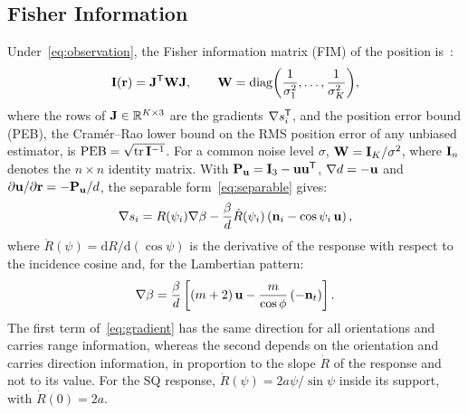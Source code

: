 \subsection{Fisher Information}
\label{subsec:fim}
Under~\eqref{eq:observation}, the Fisher information matrix (FIM) of the position is~\cite{Kay1993}:
\begin{equation}
 \mathbf{I}(\mathbf{r})=\mathbf{J}^{\mathsf T}\mathbf{W}\mathbf{J},\qquad
 {\mathbf{W}=\operatorname{diag}\!\left(\frac{1}{\sigma_1^2},\ldots,\frac{1}{\sigma_K^2}\right)},
 \label{eq:fim}
\end{equation}
where the rows of $\mathbf{J}\in\mathbb R^{K\times3}$ are the gradients $\nabla s_i^{\mathsf T}$, and the position error bound (PEB), the Cram\'er--Rao lower bound on the RMS position error of any unbiased estimator, is $\mathrm{PEB}=\sqrt{\operatorname{tr}\mathbf{I}^{-1}}$. For a common noise level $\sigma$, $\mathbf{W}=\mathbf{I}_K/\sigma^2$, where $\mathbf{I}_n$ denotes the $n\times n$ identity matrix. With $\mathbf{P}_{\mathbf{u}}=\mathbf{I}_3-\mathbf{u}\mathbf{u}^{\mathsf T}$, $\nabla d=-\mathbf{u}$ and $\partial\mathbf{u}/\partial\mathbf{r}=-\mathbf{P}_{\mathbf{u}}/d$, the separable form~\eqref{eq:separable} gives:
\begin{equation}
 \nabla s_i=R(\psi_i)\nabla\beta-\frac{\beta}{d}\dot R(\psi_i)\left(\mathbf{n}_i-\cos\psi_i\,\mathbf{u}\right),
 \label{eq:gradient}
\end{equation}
where $\dot R(\psi)=\mathrm dR/\mathrm d(\cos\psi)$ is the derivative of the response with respect to the incidence cosine and, for the Lambertian pattern:
\begin{equation}
 \nabla\beta=\frac{\beta}{d}\left[(m+2)\,\mathbf{u}-\frac{m}{\cos\phi}\,(-\mathbf{n}_t)\right].
 \label{eq:beta-gradient}
\end{equation}
The first term of~\eqref{eq:gradient} has the same direction for all orientations and carries range information, whereas the second depends on the orientation and carries direction information, in proportion to the slope $\dot R$ of the response and not to its value. For the SQ response, $\dot R(\psi)=2a\psi/\sin\psi$ inside its support, with $\dot R(0)=2a$.

